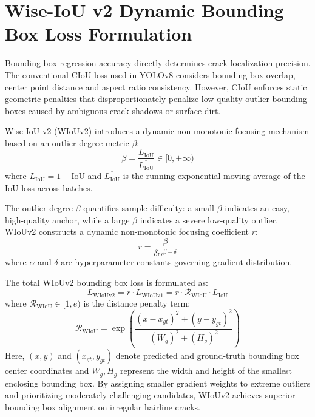 \documentclass[12pt,a4paper]{report}
\begin{document}
\section{Wise-IoU v2 Dynamic Bounding Box Loss Formulation}

Bounding box regression accuracy directly determines crack localization precision. The conventional CIoU loss used in YOLOv8 considers bounding box overlap, center point distance and aspect ratio consistency. However, CIoU enforces static geometric penalties that disproportionately penalize low-quality outlier bounding boxes caused by ambiguous crack shadows or surface dirt.

Wise-IoU v2 (WIoUv2) introduces a dynamic non-monotonic focusing mechanism based on an outlier degree metric $\beta$:
\begin{equation}
\beta = \frac{L_{\text{IoU}}}{\overline{L_{\text{IoU}}}} \in [0, +\infty)
\end{equation}
where $L_{\text{IoU}} = 1 - \text{IoU}$ and $\overline{L_{\text{IoU}}}$ is the running exponential moving average of the IoU loss across batches.

The outlier degree $\beta$ quantifies sample difficulty: a small $\beta$ indicates an easy, high-quality anchor, while a large $\beta$ indicates a severe low-quality outlier. WIoUv2 constructs a dynamic non-monotonic focusing coefficient $r$:
\begin{equation}
r = \frac{\beta}{\delta \alpha^{\beta - \delta}}
\end{equation}
where $\alpha$ and $\delta$ are hyperparameter constants governing gradient distribution.

The total WIoUv2 bounding box loss is formulated as:
\begin{equation}
L_{\text{WIoUv2}} = r \cdot L_{\text{WIoUv1}} = r \cdot \mathcal{R}_{\text{WIoU}} \cdot L_{\text{IoU}}
\end{equation}
where $\mathcal{R}_{\text{WIoU}} \in [1, e)$ is the distance penalty term:
\begin{equation}
\mathcal{R}_{\text{WIoU}} = \exp\left( \frac{(x - x_{gt})^2 + (y - y_{gt})^2}{(W_g)^2 + (H_g)^2} \right)
\end{equation}
Here, $(x, y)$ and $(x_{gt}, y_{gt})$ denote predicted and ground-truth bounding box center coordinates and $W_g, H_g$ represent the width and height of the smallest enclosing bounding box. By assigning smaller gradient weights to extreme outliers and prioritizing moderately challenging candidates, WIoUv2 achieves superior bounding box alignment on irregular hairline cracks.
\end{document}
